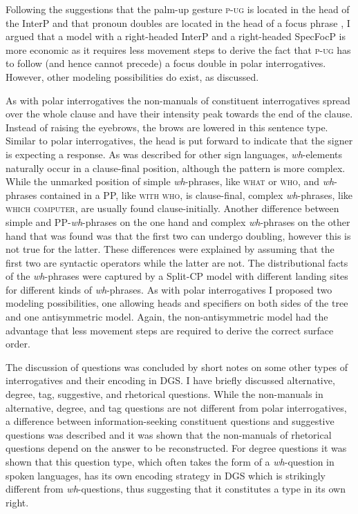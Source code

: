 Following the suggestions that the palm-up gesture \textsc{p-ug} is located in the head of the InterP \citep{aboh2010sa} and that pronoun doubles are located in the head of a focus phrase \citep{de1999phrase, sandler2006sign}, I argued that a model with a right-headed InterP and a right-headed SpecFocP is more economic as it requires less movement steps to derive the fact that \textsc{p-ug} has to follow (and hence cannot precede) a focus double in polar interrogatives. However, other modeling possibilities do exist, as discussed.

\largerpage
As with polar interrogatives the non-manuals of constituent interrogatives spread over the whole clause and have their intensity peak towards the end of the clause. Instead of raising the eyebrows, the brows are lowered in this sentence type. Similar to polar interrogatives, the head is put forward to indicate that the signer is expecting a response. As was described for other sign languages, \textit{wh}-elements naturally occur in a clause-final position, although the pattern is more complex. While the unmarked position of simple \textit{wh}-phrases, like \textsc{what} or \textsc{who}, and \textit{wh}-phrases contained in a PP, like \textsc{with who}, is clause-final, complex \textit{wh}-phrases, like \textsc{which computer}, are usually found clause-initially. Another difference between simple and PP-\textit{wh}-phrases on the one hand and complex \textit{wh}-phrases on the other hand that was found was that the first two can undergo doubling, however this is not true for the latter. These differences were explained by assuming that the first two are syntactic operators while the latter are not. The distributional facts of the \textit{wh}-phrases were captured by a Split-CP model with different landing sites for different kinds of \textit{wh}-phrases. As with polar interrogatives I proposed two modeling possibilities, one allowing heads and specifiers on both sides of the tree and one antisymmetric model. Again, the non-antisymmetric model had the advantage that less movement steps are required to derive the correct surface order.

The discussion of questions was concluded by short notes on some other types of interrogatives and their encoding in DGS. I have briefly discussed alternative, degree, tag, suggestive, and rhetorical questions. While the non-manuals in alternative, degree, and tag questions are not different from polar interrogatives, a difference between information-seeking constituent questions and suggestive questions was described and it was shown that the non-manuals of rhetorical questions depend on the answer to be reconstructed. For degree questions it was shown that this question type, which often takes the form of a \textit{wh}-question in spoken languages, has its own encoding strategy in DGS which is strikingly different from \textit{wh}-questions, thus suggesting that it constitutes a type in its own right. 

